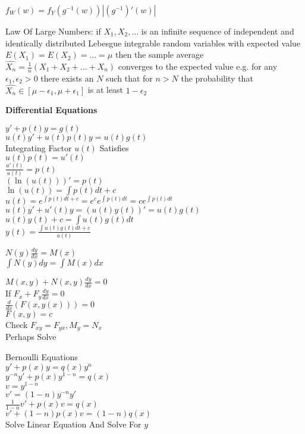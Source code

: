 $f_W(w)=f_Y(g^{-1}(w))|(g^{-1})'(w)|$

Law Of Large Numbers: if $X_1,X_2,\dots$ is an infinite sequence of independent and identically distributed Lebesgue integrable random variables with expected value $E(X_1)=E(X_2)=\dots =\mu$ then the sample average $\hat{X_n}=\frac{1}{n}(X_1+X_2+\dots+X_n)$ converges to the expected value e.g. for any $\epsilon_1, \epsilon_2 > 0$ there exists an $N$ such that for $n>N$ the probability that $\hat{X_n} \in [\mu - \epsilon_1,\mu+\epsilon_1]$ is at least $1-\epsilon_2$

\newpage

\textbf{Differential Equations}

$y'+p(t)y=g(t)$ \\
$u(t)y'+u(t)p(t)y=u(t)g(t)$ \\
Integrating Factor $u(t)$ Satisfies \\
$u(t)p(t)=u'(t)$ \\
$\frac{u'(t)}{u(t)}=p(t)$ \\
$(\ln(u(t)))'=p(t)$ \\
$\ln(u(t))=\int p(t) dt + c$ \\
$u(t)=e^{\int p(t) dt + c}=e^{c}e^{\int p(t) dt}=ce^{\int p(t) dt}$ \\
$u(t)y'+u'(t)y=(u(t)y(t))'=u(t)g(t)$ \\
$u(t)y(t)+c=\int u(t)g(t) dt$ \\
$y(t)=\frac{\int u(t)g(t) dt + c}{u(t)}$

$N(y)\frac{dy}{dx}=M(x)$ \\
$\int N(y)dy=\int M(x) dx$

$M(x,y)+N(x,y)\frac{dy}{dx}=0$ \\
If $F_x+F_y \frac{dy}{dx}=0$ \\
$\frac{d}{dx}(F(x,y(x)))=0$ \\
$F(x,y)=c$ \\
Check $F_{xy}=F_{yx},M_y=N_x$ \\
Perhaps Solve

Bernoulli Equations \\
$y'+p(x)y=q(x)y^n$ \\
$y^{-n}y'+p(x)y^{1-n}=q(x)$ \\
$v=y^{1-n}$ \\
$v'=(1-n)y^{-n}y'$ \\
$\frac{1}{1-n}v'+p(x)v=q(x)$ \\
$v'+(1-n)p(x)v=(1-n)q(x)$ \\
Solve Linear Equation And Solve For $y$

